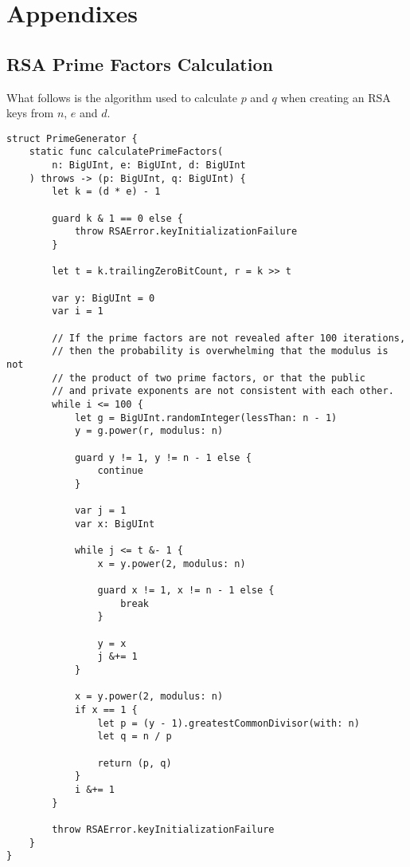 \appendix
\chapter{Appendixes}
\section{RSA Prime Factors Calculation} \label{appendix:rsa-primes}
What follows is the algorithm used to calculate $p$ and $q$ when creating an RSA keys from $n$, $e$ and $d$.
\begin{verbatim}
struct PrimeGenerator {
    static func calculatePrimeFactors(
        n: BigUInt, e: BigUInt, d: BigUInt
    ) throws -> (p: BigUInt, q: BigUInt) {
        let k = (d * e) - 1

        guard k & 1 == 0 else {
            throw RSAError.keyInitializationFailure
        }

        let t = k.trailingZeroBitCount, r = k >> t

        var y: BigUInt = 0
        var i = 1

        // If the prime factors are not revealed after 100 iterations,
        // then the probability is overwhelming that the modulus is not 
        // the product of two prime factors, or that the public 
        // and private exponents are not consistent with each other.
        while i <= 100 {
            let g = BigUInt.randomInteger(lessThan: n - 1)
            y = g.power(r, modulus: n)

            guard y != 1, y != n - 1 else {
                continue
            }

            var j = 1
            var x: BigUInt

            while j <= t &- 1 {
                x = y.power(2, modulus: n)

                guard x != 1, x != n - 1 else {
                    break
                }

                y = x
                j &+= 1
            }

            x = y.power(2, modulus: n)
            if x == 1 {
                let p = (y - 1).greatestCommonDivisor(with: n)
                let q = n / p

                return (p, q)
            }
            i &+= 1
        }

        throw RSAError.keyInitializationFailure
    }
}
\end{verbatim}